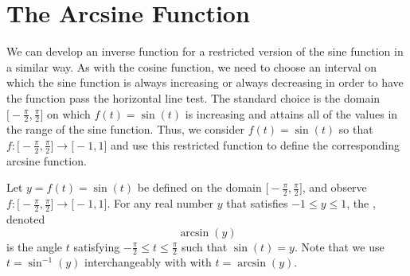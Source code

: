 \documentclass{ximera}
\begin{document}
\section{The Arcsine Function}

We can develop an inverse function for a restricted version of the sine function in a similar way.  As with the cosine function, we need to choose an interval on which the sine function is always increasing or always decreasing in order to have the function pass the horizontal line test.  The standard choice is the domain $\Big[\!\!-\!\frac{\pi}{2}, \frac{\pi}{2}\Big]$ on which $f(t) = \sin(t)$ is increasing and attains all of the values in the range of the sine function.  Thus, we consider $f(t) = \sin(t)$ so that $f : \Big[\!-\frac{\pi}{2}, \frac{\pi}{2}\Big] \to \big[\!-1,1\big]$ and use this restricted function to define the corresponding arcsine function.%
\begin{definition}
Let $y = f(t) = \sin(t)$ be defined on the domain $\Big[\!\!-\!\frac{\pi}{2}, \frac{\pi}{2}\Big]$, and observe $f : \Big[\!-\frac{\pi}{2}, \frac{\pi}{2}\Big] \to \big[\!-1,1\big]$.  For any real number $y$ that satisfies $-1 \leq y \leq 1$, the , denoted%
\begin{equation*}
\arcsin(y)
\end{equation*}
is the angle $t$ satisfying $-\frac{\pi}{2} \leq t \leq \frac{\pi}{2}$ such that $\sin(t) = y$.
%
Note that we use $t=\sin^{-1}(y)$ interchangeably with with $t = \arcsin(y)$. 
\end{definition}
\end{document}

